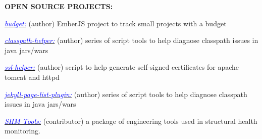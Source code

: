 {\large \textbf{OPEN SOURCE PROJECTS:}}
\begin{compactitem} 
\item \href{https://github.com/tgsoverly/budget}{\textcolor{blue}{\textit{budget:}}} (author) EmberJS project to track small projects with a budget
\item \href{https://github.com/spidasoftware/classpath-helper}{\textcolor{blue}{\textit{classpath-helper:}}} (author) series of script tools to help diagnose classpath issues in java jars/wars
\item \href{https://github.com/spidasoftware/ssl-helper}{\textcolor{blue}{\textit{ssl-helper:}}} (author) script to help generate self-signed certificates for apache tomcat and httpd
\item \href{https://github.com/tgsoverly/jekyll-page-list-plugin}{\textcolor{blue}{\textit{jekyll-page-list-plugin:}}} (author) series of script tools to help diagnose classpath issues in java jars/wars
\item \href{http://institute.lanl.gov/ei/software-and-data/SHMTools}{\textcolor{blue}{\textit{SHM Tools:}}} (contributor) a package of engineering tools used in structural health monitoring.
\bigskip
\end{compactitem}